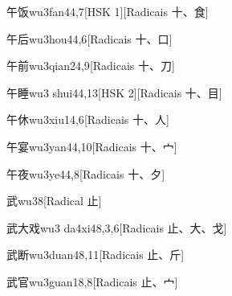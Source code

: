 \begin{entry}{午饭}{wu3fan4}{4,7}[HSK 1][Radicais ⼗、⾷]
\end{entry}

\begin{entry}{午后}{wu3hou4}{4,6}[Radicais ⼗、⼝]
\end{entry}

\begin{entry}{午前}{wu3qian2}{4,9}[Radicais ⼗、⼑]
\end{entry}

\begin{entry}{午睡}{wu3 shui4}{4,13}[HSK 2][Radicais ⼗、⽬]
\end{entry}

\begin{entry}{午休}{wu3xiu1}{4,6}[Radicais ⼗、⼈]
\end{entry}

\begin{entry}{午宴}{wu3yan4}{4,10}[Radicais ⼗、⼧]
\end{entry}

\begin{entry}{午夜}{wu3ye4}{4,8}[Radicais ⼗、⼣]
\end{entry}

\begin{entry}{武}{wu3}{8}[Radical ⽌]
\end{entry}

\begin{entry}{武大戏}{wu3 da4xi4}{8,3,6}[Radicais ⽌、⼤、⼽]
\end{entry}

\begin{entry}{武断}{wu3duan4}{8,11}[Radicais ⽌、⽄]
\end{entry}

\begin{entry}{武官}{wu3guan1}{8,8}[Radicais ⽌、⼧]
\end{entry}

